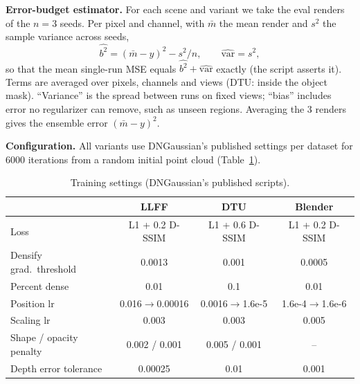 \documentclass[conference]{IEEEtran}
\begin{document}
\textbf{Error-budget estimator.} For each scene and variant we take the eval renders of the $n=3$ seeds. Per pixel and channel, with $\bar m$ the mean render and $s^2$ the sample variance across seeds,
\begin{equation}
\widehat{b^2}=(\bar m-y)^2-s^2/n,\qquad \widehat{\mathrm{var}}=s^2,
\end{equation}
so that the mean single-run MSE equals $\widehat{b^2}+\widehat{\mathrm{var}}$ exactly (the script asserts it). Terms are averaged over pixels, channels and views (DTU: inside the object mask). ``Variance'' is the spread between runs on fixed views; ``bias'' includes error no regularizer can remove, such as unseen regions. Averaging the 3 renders gives the ensemble error $(\bar m-y)^2$.

\textbf{Configuration.} All variants use DNGaussian's published settings per dataset for 6000 iterations from a random initial point cloud (Table~\ref{tab:hparams}).

\begin{table}[t]
\caption{Training settings (DNGaussian's published scripts).}\label{tab:hparams}
\centering\footnotesize\setlength{\tabcolsep}{2.5pt}
\begin{tabular}{@{}lccc@{}}
\toprule
 & LLFF & DTU & Blender \\
\midrule
Loss & L1 + 0.2 D-SSIM & L1 + 0.6 D-SSIM & L1 + 0.2 D-SSIM \\
Densify grad.\ threshold & 0.0013 & 0.001 & 0.0005 \\
Percent dense & 0.01 & 0.1 & 0.01 \\
Position lr & 0.016$\to$0.00016 & 0.0016$\to$1.6e-5 & 1.6e-4$\to$1.6e-6 \\
Scaling lr & 0.003 & 0.003 & 0.005 \\
Shape / opacity penalty & 0.002 / 0.001 & 0.005 / 0.001 & -- \\
Depth error tolerance & 0.00025 & 0.01 & 0.001 \\
\bottomrule
\end{tabular}
\end{table}

\end{document}
